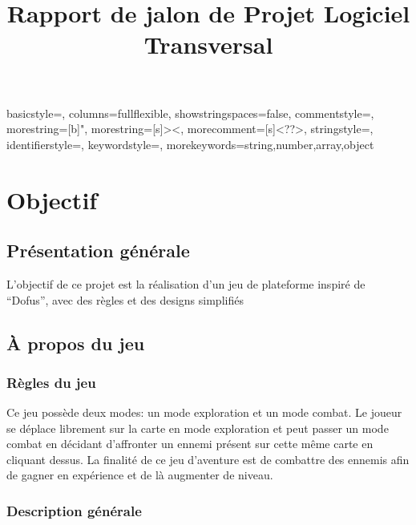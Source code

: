 \documentclass[11pt, a4paper]{article}
\begin{document}
{
   basicstyle=\normalsize,
   columns=fullflexible,
   showstringspaces=false,
   commentstyle=\color{gray}\upshape,
   morestring=[b]",
   morestring=[s]{>}{<},
   morecomment=[s]{<?}{?>},
   stringstyle=\color{orange},
   identifierstyle=\color{darkblue},
   keywordstyle=\color{blue},
   morekeywords={string,number,array,object}%
}

\title{Rapport de jalon de Projet Logiciel Transversal}

\maketitle

\tableofcontents
\newpage
 
\section{Objectif}

\subsection{Présentation générale}

L’objectif de ce projet est la réalisation d’un jeu de plateforme inspiré de “Dofus”, avec des règles et des designs simplifiés

\subsection{À propos du jeu}

\subsubsection{Règles du jeu}

Ce jeu possède deux modes: un mode exploration et un mode combat. Le joueur se déplace librement sur la carte en mode exploration et peut passer un mode combat en décidant d’affronter un ennemi présent sur cette même carte en cliquant dessus. La finalité de ce jeu d’aventure est de combattre des ennemis afin de gagner en expérience et de là augmenter de niveau.

\subsubsection{Description générale}
\end{document}
